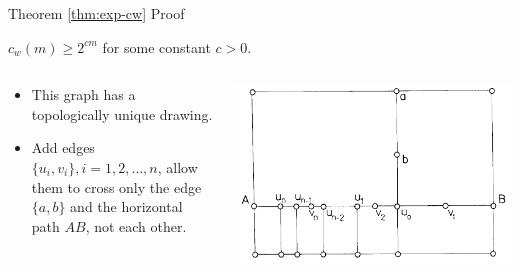 \documentclass[10pt,aspectratio=169]{beamer}
\theoremstyle{plain}
\newcommand{\set}[1]{\{#1\}}
\begin{document}
\addtocounter{theorem}{-1}
\begin{frame}[t]{Theorem \ref{thm:exp-cw} Proof}
    \begin{theorem}
        \(c_w(m) \geq 2^{c m}\) for some constant \(c > 0\).
    \end{theorem}
    \begin{columns}
        \begin{column}{0.5\textwidth}
            \begin{itemize}
                \item This graph has a topologically unique drawing.
                \item Add edges \(\set{u_i, v_i}, i=1,2,\ldots, n \), allow them to cross only the edge \(\set{a,b}\) and the horizontal path \(AB\), not each other.
            \end{itemize}
        \end{column}
        \begin{column}{0.5\textwidth}
            \includegraphics[width=\textwidth]{images/figure-11.png}
        \end{column}
    \end{columns}
\end{frame}
\end{document}
